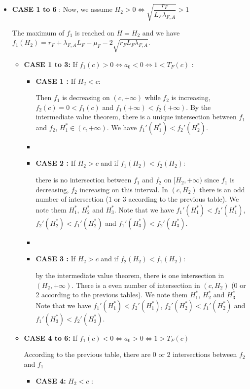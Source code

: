 \documentclass{article}
\newcommand{\lfa}{\lambda_{F, A}}
\begin{document}
\begin{appendices}
\begin{itemize}
\item \textbf{CASE 1 to 6} : Now, we assume $H_2 > 0 \Leftrightarrow \sqrt{\dfrac{r_F}{L_F \lfa} } > 1$

The maximum of $f_1$ is reached on $H= H_2$ and we have $f_1(H_2) = r_F + \lfa L_F - \mu_F - 2 \sqrt{r_F L_F \lfa}$.

\begin{itemize}
\item \textbf{CASE 1 to 3:} If $f_1(c) > 0 \Leftrightarrow a_0 < 0 \Leftrightarrow 1 < T_F(c)$ :
\begin{itemize}
\item \textbf{CASE 1 :} If $H_2 < c$: 

Then $f_1$ is decreasing on $(c, +\infty)$ while $f_2$ is increasing, $f_2(c) = 0 < f_1(c)$ and $f_1(+\infty) < f_2(+\infty)$. By the intermediate value theorem, there is a unique intersection between $f_1$ and $f_2$, $H^*_1 \in (c, + \infty)$. We have $f_1'(H^*_1) < f_2'(H^*_2)$.

\item[]
\item \textbf{CASE 2 :} If $H_2 > c$ and if $f_1(H_2) < f_2(H_2)$: 

there is no intersection between $f_1$ and $f_2$  on $[H_2 , +\infty)$ since $f_1$ is decreasing, $f_2$ increasing on this interval. In $(c, H_2)$ there is an odd number of intersection (1 or 3 according to the previous table). We note them $H^*_1$, $H^*_2$ and $H^*_3$.  Note that we have $f_1'(H^*_1) < f_2'(H^*_1)$, $f_2'(H^*_2) < f_1'(H^*_2)$ and $f_1'(H^*_3) < f_2'(H^*_3)$.
\item[]
\item \textbf{CASE 3 :} If $H_2 > c$ and if $f_2(H_2) < f_1(H_2)$:

by the intermediate value theorem, there is one intersection in $(H_2, +\infty)$. There is a even number of intersection in $(c, H_2)$ (0 or 2 according to the previous tables). We note them $H^*_1$, $H^*_2$ and $H^*_3$  Note that we have $f_1'(H^*_1) < f_2'(H^*_1)$, $f_2'(H^*_2) < f_1'(H^*_2)$ and $f_1'(H^*_3) < f_2'(H^*_3)$.


\end{itemize}

\item \textbf{CASE 4 to 6:} If $f_1(c) < 0 \Leftrightarrow a_0 > 0 \Leftrightarrow 1 > T_F(c)$

According to the previous table, there are 0 or 2 intersections between $f_2$ and $f_1$
\begin{itemize}
\item \textbf{CASE 4:} $H_2 < c$ :


\end{itemize}
\end{itemize}
\end{itemize}
\end{appendices}
\end{document}
